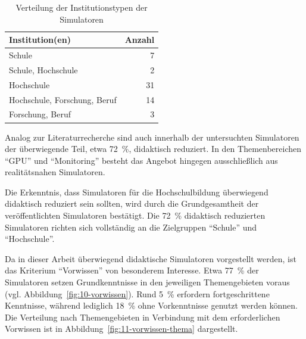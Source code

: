 \begin{table}[h]
	\centering
	\caption{Verteilung der Institutionstypen der Simulatoren}
	\label{tab:institutionen}
	\begin{tabular}{l r}
		\toprule
		\textbf{Institution(en)} & \textbf{Anzahl} \\
		\midrule
		Schule                        & 7  \\
		Schule, Hochschule            & 2  \\
		Hochschule                    & 31 \\
		Hochschule, Forschung, Beruf  & 14 \\
		Forschung, Beruf              & 3  \\
		\bottomrule
	\end{tabular}
\end{table}

Analog zur Literaturrecherche sind auch innerhalb der untersuchten Simulatoren der überwiegende Teil, etwa 72~\%, didaktisch reduziert. In den Themenbereichen \enquote{GPU} und \enquote{Monitoring} besteht das Angebot hingegen ausschließlich aus realitätsnahen Simulatoren.

Die Erkenntnis, dass Simulatoren für die Hochschulbildung überwiegend didaktisch reduziert sein sollten, wird durch die Grundgesamtheit der veröffentlichten Simulatoren bestätigt. Die 72~\% didaktisch reduzierten Simulatoren richten sich vollständig an die Zielgruppen \enquote{Schule} und \enquote{Hochschule}.

Da in dieser Arbeit überwiegend didaktische Simulatoren vorgestellt werden, ist das Kriterium \enquote{Vorwissen} von besonderem Interesse. Etwa 77~\% der Simulatoren setzen Grundkenntnisse in den jeweiligen Themengebieten voraus (vgl. Abbildung~\ref{fig:10-vorwissen}). Rund 5~\% erfordern fortgeschrittene Kenntnisse, während lediglich 18~\% ohne Vorkenntnisse genutzt werden können. Die Verteilung nach Themengebieten in Verbindung mit dem erforderlichen Vorwissen ist in Abbildung~\ref{fig:11-vorwissen-thema} dargestellt.

